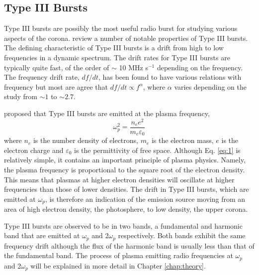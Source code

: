 \subsection{Type III Bursts}
\label{characteristics} 
Type III bursts are possibly the most useful radio burst for studying various aspects of the corona.
\cite{Reid2014} review a number of notable properties of Type III bursts. The defining characteristic of Type III bursts is a drift from high to low frequencies in a dynamic spectrum. The drift rates for Type III bursts are typically quite fast, of the order of $\sim$ 10 MHz s$^{-1}$ depending on the frequency. The frequency drift rate, $df/dt$, has been found to have various relations with frequency \citep{Reid2014} but most are agree that $df/dt \propto f^{\alpha}$, where $\alpha$ varies depending on the study from $\sim 1$ to $\sim 2.7$. 

\cite{Ginzburg1958} proposed that Type III bursts are emitted at the plasma frequency,
\begin{equation}\label{eq:1}
    \omega_{p}^2 = \frac{n_ee^2}{m_e \varepsilon_0}
\end{equation}
where $n_e$ is the number density of electrons, $m_e$ is the electron mass, $e$ is the electron charge and $\varepsilon_0$ is the permittivity of free space.
Although Eq. \ref{eq:1} is relatively simple, it contains an important principle of plasma physics. Namely, the plasma frequency is proportional to the square root of the electron density. This means that plasmas at higher electron densities will oscillate at higher frequencies than those of lower densities. The drift in Type III bursts, which are emitted at $\omega_p$, is therefore an indication of the emission source moving from an area of high electron density, the photosphere, to low density, the upper corona.

Type III bursts are observed to be in two bands, a fundamental and harmonic band that are emitted at $\omega_p$ and $2 \omega_p$ respectively. Both bands exhibit the same frequency drift although the flux of the harmonic band is usually less than that of the fundamental band. The process of plasma emitting radio frequencies at $\omega_p$ and $2 \omega_p$ will be explained in more detail in Chapter \ref{chap:theory}. 

